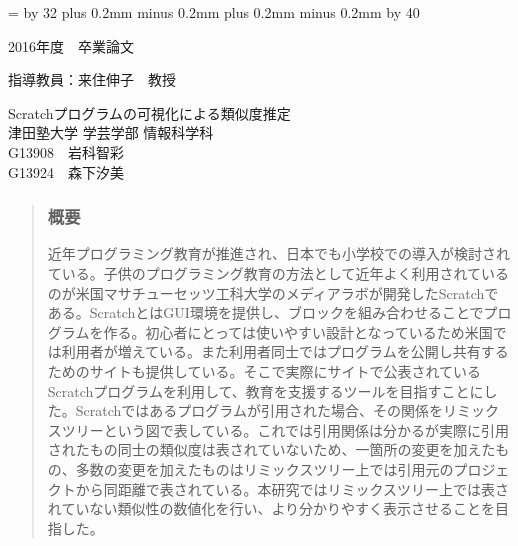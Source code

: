\documentclass[a4paper,10pt,onecolumn,oneside,openany]{jsbook}
\def\linesparpage#1{\baselineskip=\textheight
   \divide\baselineskip by #1}
\def\kcharparline#1{%
   \ifx\xkanjiskip\undefined%
   \jintercharskip 0mm plus 0.2mm minus 0.2mm
   \else
   \xkanjiskip 0mm plus 0.2mm minus 0.2mm
   \fi
   \settowidth{\textwidth}{あ}%
   \multiply\textwidth by #1}
\begin{document}
\linesparpage{32} %
\kcharparline{40} %
\begin{titlepage}
\begin{flushleft}
{\large
2016年度　卒業論文 \\ 
}
\end{flushleft}
\begin{flushright}
{\large
指導教員：来住伸子　教授 \\ %
}
\end{flushright}

\begin{center}
\vspace{150truept}
{\huge Scratchプログラムの可視化による類似度推定}\\ %

\vspace{80truept}
{\huge 津田塾大学 学芸学部 情報科学科}\\
\vspace{30truept}
{\huge G13908　岩科智彩}\\ %
\vspace{10truept}
{\huge G13924　森下汐美}\\ %
\end{center}
\end{titlepage}

\frontmatter
\begin{abstract} %
\subsubsection{概要}
近年プログラミング教育が推進され、日本でも小学校での導入が検討されている。子供のプログラミング教育の方法として近年よく利用されているのが米国マサチューセッツ工科大学のメディアラボが開発したScratchである。ScratchとはGUI環境を提供し、ブロックを組み合わせることでプログラムを作る。初心者にとっては使いやすい設計となっているため米国では利用者が増えている。また利用者同士ではプログラムを公開し共有するためのサイトも提供している。そこで実際にサイトで公表されているScratchプログラムを利用して、教育を支援するツールを目指すことにした。Scratchではあるプログラムが引用された場合、その関係をリミックスツリーという図で表している。これでは引用関係は分かるが実際に引用されたもの同士の類似度は表されていないため、一箇所の変更を加えたもの、多数の変更を加えたものはリミックスツリー上では引用元のプロジェクトから同距離で表されている。本研究ではリミックスツリー上では表されていない類似性の数値化を行い、より分かりやすく表示させることを目指した。
\end{abstract}
\end{document}
